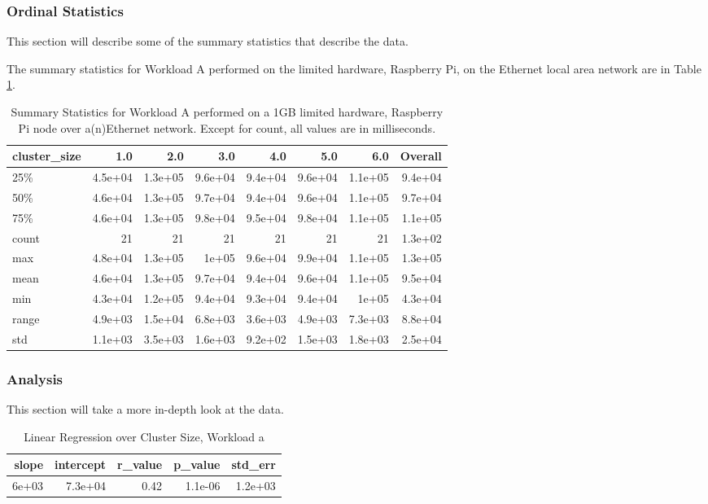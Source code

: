 \subsubsection{Ordinal Statistics}
This section will describe some of the summary statistics that describe the data.  

The summary statistics for Workload A performed on the limited hardware, Raspberry Pi, on the Ethernet local area network are in Table \ref{table:summary_table_a_1GB_rp_eth}.
\begin{table}
\begin{tabular}{lrrrrrrr}
\toprule
cluster\_size &     1.0 &     2.0 &     3.0 &     4.0 &     5.0 &     6.0 &  Overall \\
\midrule
25\%   & 4.5e+04 & 1.3e+05 & 9.6e+04 & 9.4e+04 & 9.6e+04 & 1.1e+05 &  9.4e+04 \\
50\%   & 4.6e+04 & 1.3e+05 & 9.7e+04 & 9.4e+04 & 9.6e+04 & 1.1e+05 &  9.7e+04 \\
75\%   & 4.6e+04 & 1.3e+05 & 9.8e+04 & 9.5e+04 & 9.8e+04 & 1.1e+05 &  1.1e+05 \\
count &      21 &      21 &      21 &      21 &      21 &      21 &  1.3e+02 \\
max   & 4.8e+04 & 1.3e+05 &   1e+05 & 9.6e+04 & 9.9e+04 & 1.1e+05 &  1.3e+05 \\
mean  & 4.6e+04 & 1.3e+05 & 9.7e+04 & 9.4e+04 & 9.6e+04 & 1.1e+05 &  9.5e+04 \\
min   & 4.3e+04 & 1.2e+05 & 9.4e+04 & 9.3e+04 & 9.4e+04 &   1e+05 &  4.3e+04 \\
range & 4.9e+03 & 1.5e+04 & 6.8e+03 & 3.6e+03 & 4.9e+03 & 7.3e+03 &  8.8e+04 \\
std   & 1.1e+03 & 3.5e+03 & 1.6e+03 & 9.2e+02 & 1.5e+03 & 1.8e+03 &  2.5e+04 \\
\bottomrule
\end{tabular}
\caption{Summary Statistics for Workload A performed on a 1GB limited hardware, Raspberry Pi node over a(n)Ethernet network.  Except for count, all values are in milliseconds.}
\label{table:summary_table_a_1GB_rp_eth}
\end{table}



\subsubsection{Analysis}
This section will take a more in-depth look at the data.


\begin{table}[H]
\centering
\begin{tabular}{rrrrr}
\toprule
 slope &  intercept &  r\_value &  p\_value &  std\_err \\
\midrule
 6e+03 &    7.3e+04 &     0.42 &  1.1e-06 &  1.2e+03 \\
\bottomrule
\end{tabular}
\caption{Linear Regression over Cluster Size, Workload a}
\label{table:rp_only_a}
\end{table}



